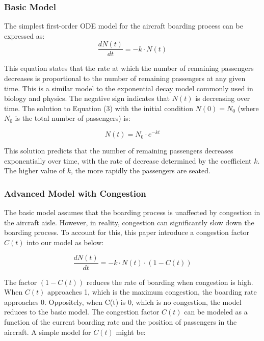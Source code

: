 \documentclass[12pt]{article}
\begin{document}
\subsubsection{Basic Model}

The simplest first-order ODE model for the aircraft boarding process can be expressed as:
\begin{equation}
\frac{dN(t)}{dt} = -k \cdot N(t)
\end{equation}

This equation states that the rate at which the number of remaining passengers decreases is proportional to the number of remaining passengers at any given time. This is a similar model to the exponential decay model commonly used in biology and physics. The negative sign indicates that $N(t)$ is decreasing over time. The solution to Equation (3) with the initial condition $N(0) = N_0$ (where $N_0$ is the total number of passengers) is:

\begin{equation}
N(t) = N_0 \cdot e^{-kt}
\end{equation}

This solution predicts that the number of remaining passengers decreases exponentially over time, with the rate of decrease determined by the coefficient $k$. The higher value of $k$, the more rapidly the passengers are seated.

\subsubsection{Advanced Model with Congestion}

The basic model assumes that the boarding process is unaffected by congestion in the aircraft aisle. However, in reality, congestion can significantly slow down the boarding process. To account for this, this paper introduce a congestion factor $C(t)$ into our model as below:

\begin{equation}
\frac{dN(t)}{dt} = -k \cdot N(t) \cdot (1 - C(t))
\end{equation}

The factor $(1 - C(t))$ reduces the rate of boarding when congestion is high. When $C(t)$ approaches 1, which is the maximum congestion, the boarding rate approaches 0. Oppositely, when C(t) is 0, which is no congestion, the model reduces to the basic model. The congestion factor $C(t)$ can be modeled as a function of the current boarding rate and the position of passengers in the aircraft. A simple model for $C(t)$ might be:
\end{document}

